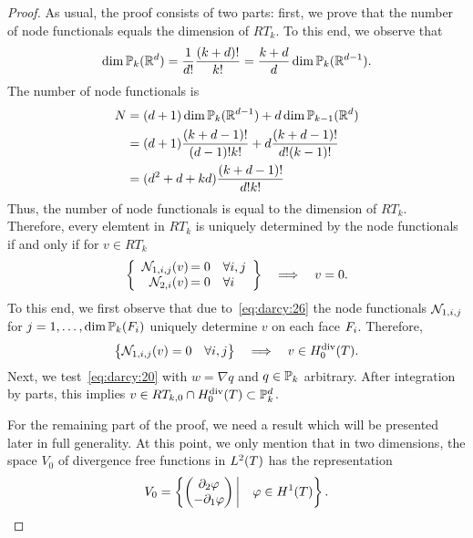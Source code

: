 \begin{proof}
  As usual, the proof consists of two parts: first, we prove that the
  number of node functionals equals the dimension of $RT_k$. To this
  end, we observe that
  \begin{gather*}
    \dim \P_k(\R^d) = \frac1{d!} \frac{(k+d)!}{k!}
    = \frac{k+d}d \dim \P_k(\R^{d-1}).
  \end{gather*}
  The number of node functionals is
  \begin{align*}
    N &= (d+1) \dim \P_k(\R^{d-1}) + d \dim \P_{k-1}(\R^d)
    \\
    &= (d+1)\frac{(k+d-1)!}{(d-1)!k!}
      + d\frac{(k+d-1)!}{d! (k-1)!}\\
    &= (d^2+d+kd)\frac{(k+d-1)!}{d!k!}
  \end{align*}
  Thus, the number of node functionals is equal to the dimension of
  $RT_k$. Therefore, every elemtent in $RT_k$ is uniquely determined
  by the node functionals if and only if for $v\in RT_k$
  \begin{gather*}
    \left\{
      \begin{array}{r@{\,}ll}
        \nodal_{1,i,j}(v) &=0 &\forall i,j
        \\
        \nodal_{2,i}(v) &=0 &\forall i
      \end{array}
      \right\}
      \quad\Longrightarrow\quad
      v=0.
  \end{gather*}
  To this end, we first observe that due to~\eqref{eq:darcy:26} the
  node functionals $\nodal_{1,i,j}$ for $j=1,\dots,\dim \P_k(\face_i)$
 uniquely determine $v$ on each face $\face_i$. Therefore,
 \begin{gather*}
   \bigl\{\nodal_{1,i,j}(v) =0 \quad\forall i,j\bigr\}
   \quad\Longrightarrow\quad
   v\in \Hdiv_0(\cell).
 \end{gather*}
 Next, we test~\eqref{eq:darcy:20} with $w=\nabla q$ and $q\in
 \P_k$ arbitrary. After integration by parts, this implies $v\in
 RT_{k,0} \cap \Hdiv_0(\cell) \subset \P_k^d$.

 For the remaining part of the proof, we need a result which will be
 presented later in full generality. At this point, we only mention
 that in two dimensions, the space $V_0$ of divergence free functions
 in $L^2(\cell)$ has the representation
 \begin{gather*}
   V_0 = \left\{
     \begin{pmatrix}
       \d_2 \phi \\ -\d_1 \phi
     \end{pmatrix}
     \bigg\vert \quad \phi\in H^1(\cell) \right\}.
 \end{gather*}


\end{proof}
